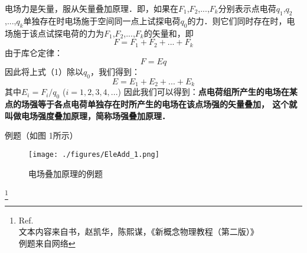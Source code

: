 
电场力是矢量，服从矢量叠加原理．即，如果在$F_1$,$F_2$,...,$F_k$分别表示点电荷$q_1$,$q_2$,...,$q_k$单独存在时电场施于空间同一点上试探电荷$q_0$的力．则它们同时存在时，电场施于该点试探电荷的力为$F_1$,$F_2$,...,$F_k$的矢量和，即
\begin{equation}
F = F_1 +F_2 +...+F_k
\end{equation}
由于库仑定律：
\begin{equation}
  F = Eq
\end{equation}
因此将上式（1）除以$q_0$，我们得到： 
\begin{equation}
E = E_1 + E_2 + ... +E_k
\end{equation}
其中$E_i = F_i/q_0$      ($i=1, 2, 3, 4, ...$)
因此我们可以得到：\textbf{点电荷组所产生的电场在某点的场强等于各点电荷单独存在时所产生的电场在该点场强的矢量叠加， 这个就叫做电场强度叠加原理，简称场强叠加原理．}


例题（如图 1所示）
\begin{figure}[ht]
\centering
\texttt{[image: ./figures/EleAdd\_1.png]}
\caption{电场叠加原理的例题} \label{EleAdd_fig1}
\end{figure}

\footnote{Ref.\\ [1]文本内容来自书，赵凯华，陈熙谋，《新概念物理教程（第二版）》\\
               [2]例题来自网络}